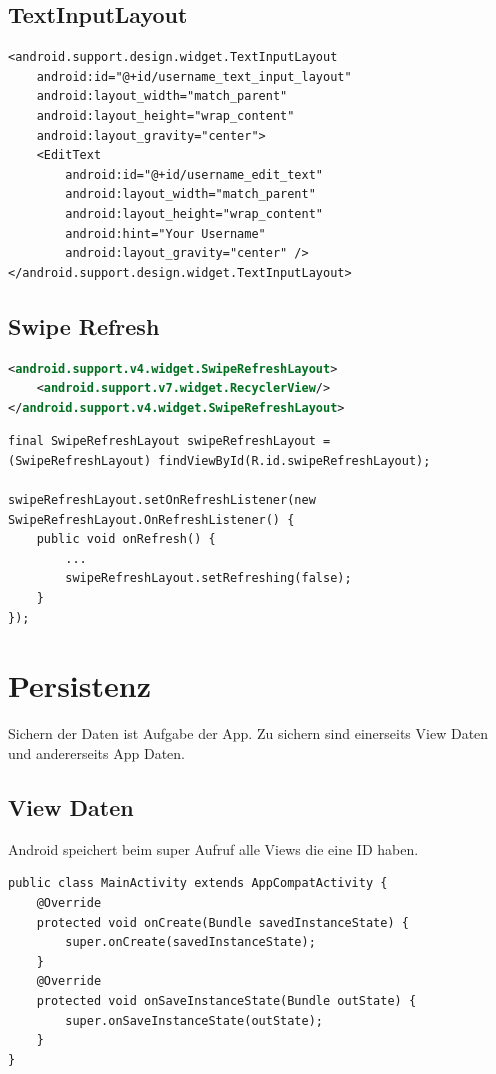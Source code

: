 \subsection{TextInputLayout}
\begin{lstlisting}[caption=TextInput Layout]
<android.support.design.widget.TextInputLayout
	android:id="@+id/username_text_input_layout"
	android:layout_width="match_parent"
	android:layout_height="wrap_content"
	android:layout_gravity="center">
	<EditText
		android:id="@+id/username_edit_text"
		android:layout_width="match_parent"
		android:layout_height="wrap_content"
		android:hint="Your Username"
		android:layout_gravity="center" />
</android.support.design.widget.TextInputLayout>
\end{lstlisting}


\subsection{Swipe Refresh}
\begin{lstlisting}[caption=Swipe Refresh, language=XML]
<android.support.v4.widget.SwipeRefreshLayout>
	<android.support.v7.widget.RecyclerView/>
</android.support.v4.widget.SwipeRefreshLayout>
\end{lstlisting}

\begin{lstlisting}[caption=Swipe Refresh]
final SwipeRefreshLayout swipeRefreshLayout = 
(SwipeRefreshLayout) findViewById(R.id.swipeRefreshLayout);

swipeRefreshLayout.setOnRefreshListener(new SwipeRefreshLayout.OnRefreshListener() {
	public void onRefresh() {
		...
		swipeRefreshLayout.setRefreshing(false);
	}
});
\end{lstlisting}


\section{Persistenz}
Sichern der Daten ist Aufgabe der App. Zu sichern sind einerseits View Daten und andererseits App Daten.
\subsection{View Daten}
Android speichert beim super Aufruf alle Views die eine ID haben.
\begin{lstlisting}[caption=View Daten persistieren]
public class MainActivity extends AppCompatActivity {
	@Override
	protected void onCreate(Bundle savedInstanceState) {
		super.onCreate(savedInstanceState);
	}
	@Override
	protected void onSaveInstanceState(Bundle outState) {
		super.onSaveInstanceState(outState);
	}
}
\end{lstlisting}

